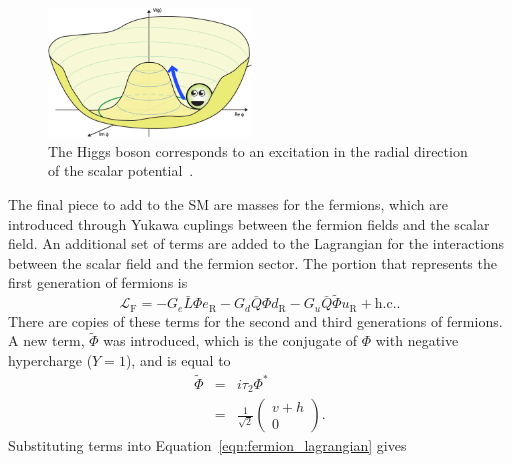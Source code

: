 \begin{figure}[ht]
  \centering
  \includegraphics[width=0.48\textwidth]{figs/theory/Higgs-Potential-radial.png}
  \caption{
    The Higgs boson corresponds to an excitation in the radial direction
    of the scalar potential~\cite{QuantumDiariesHiggs}.
  }
  \label{fig:higgs_mass}
\end{figure}

The final piece to add to the SM are masses for the fermions, which are
introduced through Yukawa cuplings between the fermion fields and the scalar
field.
An additional set of terms are added to the Lagrangian for the interactions
between the scalar field and the fermion sector.
The portion that represents the first generation of fermions is
\begin{equation}
  \mathcal{L}_\mathrm{F} =
  - G_e \bar{L} \Phi e_\mathrm{R}
  - G_d \bar{Q} \Phi d_\mathrm{R}
  - G_u \bar{Q} \tilde{\Phi} u_\mathrm{R}
  + \mathrm{h.c.}.
  \label{eqn:fermion_lagrangian}
\end{equation}
There are copies of these terms for the second and third generations of
fermions.
A new term, $\tilde{\Phi}$ was introduced, which is the conjugate of $\Phi$
with negative hypercharge ($Y = 1$), and is equal to
\begin{eqnarray}
  \tilde{\Phi} &=& i \tau_2 \Phi^{*} \\
               &=& \frac{1}{\sqrt{2}} \begin{pmatrix} v + h \\ 0 \end{pmatrix}.
\end{eqnarray}
Substituting terms into Equation~\ref{eqn:fermion_lagrangian} gives
